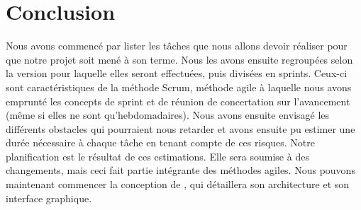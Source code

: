 \section{Conclusion}
	\label{sec:conclusion}

	Nous avons commencé par lister les tâches que nous allons devoir réaliser pour que notre projet soit mené à son terme. Nous les avons ensuite regroupées selon la version pour laquelle elles seront effectuées, puis divisées en sprints. Ceux-ci sont caractéristiques de la méthode Scrum, méthode agile à laquelle nous avons emprunté les concepts de sprint et de réunion de concertation sur l'avancement (même si elles ne sont qu'hebdomadaires). Nous avons ensuite envisagé les différents obstacles qui pourraient nous retarder et avons ensuite pu estimer une durée nécessaire à chaque tâche en tenant compte de ces risques. Notre planification est le résultat de ces estimations. Elle sera soumise à des changements, mais ceci fait partie intégrante des méthodes agiles. Nous pouvons maintenant commencer la conception de \glasir{}, qui détaillera son architecture et son interface graphique.
